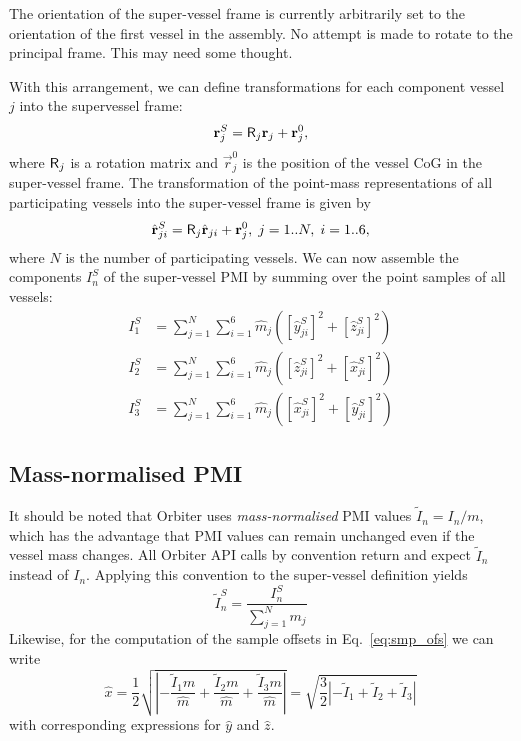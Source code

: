\documentclass[Orbiter Technical Reference.tex]{subfiles}
\begin{document}
The orientation of the super-vessel frame is currently arbitrarily set to the orientation of the first vessel in the assembly. No attempt is made to rotate to the principal frame. This may need some thought.

With this arrangement, we can define transformations for each component vessel $j$ into the supervessel frame:
\begin{equation}
  \mathbf{r}_j^S = \mathsf{R}_j \mathbf{r}_j + \mathbf{r}_j^0,
\end{equation}
where $\mathsf{R}_j$ is a rotation matrix and $\vec{r}_j^0$ is the position of the vessel CoG in the super-vessel frame.
The transformation of the point-mass representations of all participating vessels into the super-vessel frame is given by
\begin{equation}
\hat{\mathbf{r}}_{ji}^S = \mathsf{R}_j \hat{\mathbf{r}}_{ji} + \mathbf{r}_j^0, \; j=1..N, \; i=1..6,
\end{equation}
where $N$ is the number of participating vessels.
We can now assemble the components $I_n^S$ of the super-vessel PMI by summing over the point samples of all vessels:
\begin{equation}
\begin{split}
I_1^S & = \sum_{j=1}^N \sum_{i=1}^6 \hat m_j ([\hat y_{ji}^S]^2 + [\hat z_{ji}^S]^2)\\
I_2^S & = \sum_{j=1}^N \sum_{i=1}^6 \hat m_j ([\hat z_{ji}^S]^2 + [\hat x_{ji}^S]^2)\\
I_3^S & = \sum_{j=1}^N \sum_{i=1}^6 \hat m_j ([\hat x_{ji}^S]^2 + [\hat y_{ji}^S]^2)
\end{split}
\end{equation}

\subsection{Mass-normalised PMI}
It should be noted that Orbiter uses \emph{mass-normalised} PMI values $\tilde I_n = I_n/m$, which has the advantage that PMI values can remain unchanged even if the vessel mass changes. All Orbiter API calls by convention return and expect $\tilde I_n$ instead of $I_n$. Applying this convention to the super-vessel definition yields
\begin{equation}
\tilde{I}_n^S = \frac{I_n^S}{\sum_{j=1}^N m_j}
\end{equation}
Likewise, for the computation of the sample offsets in Eq.~\ref{eq:smp_ofs} we can write
\begin{equation}
  \hat x = \frac{1}{2} \sqrt{\left| -\frac{\tilde{I}_1 m}{\hat m} + \frac{\tilde{I}_2 m}{\hat m} + \frac{\tilde{I}_3 m}{\hat m} \right|} =
  \sqrt{\frac{3}{2} \left| -\tilde{I}_1 + \tilde{I}_2 + \tilde{I}_3 \right|}
\end{equation}
with corresponding expressions for $\hat y$ and $\hat z$.
\end{document}
